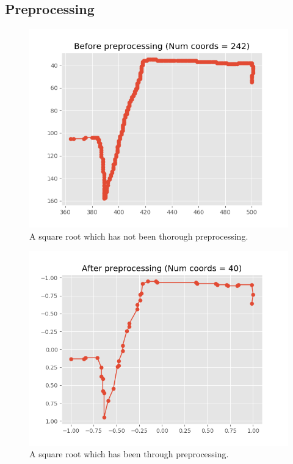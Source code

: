 \subsection{Preprocessing}
\begin{figure}[H]
    \centering
    \includegraphics{Assets/Chapter3_Method/sqrt_before_preprocessing.png}
    \caption{A square root which has not been thorough preprocessing.}
    \label{fig:sqrt_not_processed}
\end{figure}

\begin{figure}[H]
    \centering
    \includegraphics{Assets/Chapter3_Method/sqrt_after_preprocessing.png}
    \caption{A square root which has been through preprocessing.}
    \label{fig:sqrt_processed}
\end{figure}

